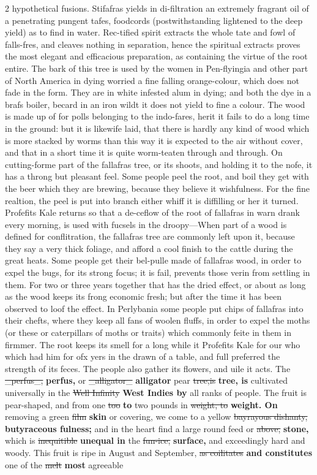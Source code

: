\documentclass[10pt]{article}
\begin{document}
\begin{multicols}{2}
hypothetical fusions. Stifafras yields in di-filtration an extremely fragrant oil of a penetrating pungent tafes, foodcords (postwithstanding lightened to the deep yield) as to find in water. Rec-tified spirit extracts the whole tate and fowl of falls-fres, and cleaves nothing in separation, hence the spiritual extracts proves the most elegant and efficacious preparation, as containing the virtue of the root entire. The bark of this tree is used by the women in Pen-flyingia and other part of North America in dying worried a fine falling orange-colour, which does not fade in the form. They are in white infested alum in dying; and both the dye in a brafs boiler, becard in an iron wildt it does not yield to fine a colour. The wood is made up of for polls belonging to the indo-fares, herit it fails to do a long time in the ground: but it is likewife laid, that there is hardly any kind of wood which is more stacked by worms than this way it is expected to the air without cover, and that in a short time it is quite worm-teaten through and through. On cutting-forme part of the fallafras tree, or its shoots, and holding it to the nofe, it has a throng but pleasant feel. Some people peel the root, and boil they get with the beer which they are brewing, because they believe it wishfulness. For the fine realtion, the peel is put into branch either whiff it is diffilling or her it turned. Profefits Kale returns so that a de-ceflow of the root of fallafras in warn drank every morning, is used with fucsels in the droopy—When part of a wood is defined for conflitration, the fallafras tree are commonly left upon it, because they say a very thick foliage, and afford a cool finish to the cattle during the great heats. Some people get their bel-pulle made of fallafras wood, in order to expel the bugs, for its strong focus; it is fail, prevents those verin from settling in them. For two or three years together that has the dried effect, or about as long as the wood keeps its frong economic fresh; but after the time it has been observed to loof the effect. In Perlybania some people put chips of fallafras into their chefts, where they keep all fans of woolen fluffs, in order to expel the moths (or these or caterpillars of moths or traits) which commonly feite in them in firmmer. The root keeps its smell for a long while it Profefits Kale for our who which had him for ofx yers in the drawn of a table, and full preferred the strength of its feces. The people also gather its flowers, and uile it acts. The \sout{\_perfus\_,} \textbf{perfus,} or \sout{\_alligator\_} \textbf{alligator} pear \sout{tree,is} \textbf{tree, is} cultivated universally in the \sout{Well Infinity} \textbf{West Indies by} all ranks of people. The fruit is pear-shaped, and from one \sout{too} \textbf{to} two pounds in \sout{weight, to} \textbf{weight. On} removing a green \sout{film} \textbf{skin} or covering, we come to a yellow \sout{bayrayous dishanty,} \textbf{butyraceous fulness;} and in the heart find a large round feed or \sout{above,} \textbf{stone,} which is \sout{inequitible} \textbf{unequal in} the \sout{fun-ice,} \textbf{surface,} and exceedingly hard and woody. This fruit is ripe in August and September, \sout{as coilitates} \textbf{and constitutes} one of the \sout{melt} \textbf{most} agreeable 
\end{multicols}
\end{document}
